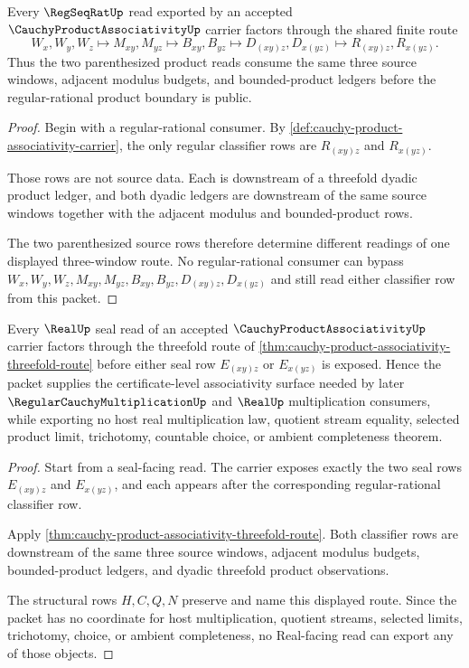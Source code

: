 \begin{theorem}
\label{thm:cauchy-product-associativity-threefold-route}
Every $\RegSeqRatUp$ read exported by an accepted $\CauchyProductAssociativityUp$ carrier factors through the shared finite route
$$
W_x,W_y,W_z \longmapsto M_{xy},M_{yz} \longmapsto B_{xy},B_{yz} \longmapsto D_{(xy)z},D_{x(yz)} \longmapsto R_{(xy)z},R_{x(yz)} .
$$
Thus the two parenthesized product reads consume the same three source windows, adjacent modulus budgets, and bounded-product ledgers before the regular-rational product boundary is public.
\end{theorem}
\begin{proof}
Begin with a regular-rational consumer. By \autoref{def:cauchy-product-associativity-carrier}, the only regular classifier rows are $R_{(xy)z}$ and $R_{x(yz)}$.

Those rows are not source data. Each is downstream of a threefold dyadic product ledger, and both dyadic ledgers are downstream of the same source windows together with the adjacent modulus and bounded-product rows.

The two parenthesized source rows therefore determine different readings of one displayed three-window route. No regular-rational consumer can bypass $W_x,W_y,W_z,M_{xy},M_{yz},B_{xy},B_{yz},D_{(xy)z},D_{x(yz)}$ and still read either classifier row from this packet.
\end{proof}

\begin{theorem}
\label{thm:cauchy-product-associativity-real-seal-boundary}
Every $\RealUp$ seal read of an accepted $\CauchyProductAssociativityUp$ carrier factors through the threefold route of \autoref{thm:cauchy-product-associativity-threefold-route} before either seal row $E_{(xy)z}$ or $E_{x(yz)}$ is exposed. Hence the packet supplies the certificate-level associativity surface needed by later $\RegularCauchyMultiplicationUp$ and $\RealUp$ multiplication consumers, while exporting no host real multiplication law, quotient stream equality, selected product limit, trichotomy, countable choice, or ambient completeness theorem.
\end{theorem}
\begin{proof}
Start from a seal-facing read. The carrier exposes exactly the two seal rows $E_{(xy)z}$ and $E_{x(yz)}$, and each appears after the corresponding regular-rational classifier row.

Apply \autoref{thm:cauchy-product-associativity-threefold-route}. Both classifier rows are downstream of the same three source windows, adjacent modulus budgets, bounded-product ledgers, and dyadic threefold product observations.

The structural rows $H,C,Q,N$ preserve and name this displayed route. Since the packet has no coordinate for host multiplication, quotient streams, selected limits, trichotomy, choice, or ambient completeness, no Real-facing read can export any of those objects.
\end{proof}

